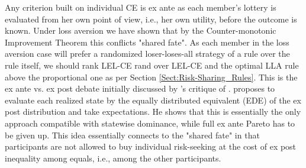 \documentclass[11pt,a4paper]{article}
\theoremstyle{definition}
\theoremstyle{plain}
\theoremstyle{remark}
\newcommand{\1}{\mathbf{1}}
\begin{document}
Any criterion built on individual CE is ex ante as each member's lottery is evaluated from her own point of view, i.e., her own utility, before the outcome is known. Under loss aversion we have shown that by the Counter-monotonic Improvement Theorem \citep{Lauzier2024} this conflicts "shared fate". As each member in the loss aversion case will prefer a randomized loser-loses-all strategy of a rule over the rule itself, we should rank LEL-CE rand over LEL-CE and the optimal LLA rule above the proportional one as per Section \ref{Sect:Risk-Sharing_Rules}. This is the ex ante vs. ex post debate initially discussed by \citet{Diamond1967}'s critique of \citet{Harsanyi1955}. \citet{Fleurbaey2010} proposes to evaluate each realized state by the equally distributed equivalent (EDE) of the ex post distribution and take expectations. He shows that this is essentially the only approach compatible with statewise dominance, while full ex ante Pareto has to be given up. This idea essentially connects to the "shared fate" in that participants are not allowed to buy individual risk-seeking at the cost of ex post inequality among equals, i.e., among the other participants.
\end{document}
